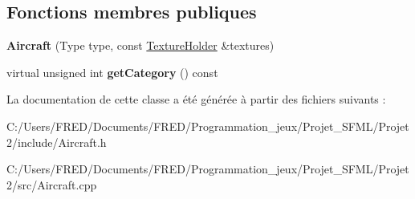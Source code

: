 \subsection*{Fonctions membres publiques}
\begin{DoxyCompactItemize}
\item 
{\bfseries Aircraft} (Type type, const \hyperlink{class_resource_holder}{Texture\+Holder} \&textures)\hypertarget{class_aircraft_ae42f913aa28db8c4657e515a583af1d2}{}\label{class_aircraft_ae42f913aa28db8c4657e515a583af1d2}

\item 
virtual unsigned int {\bfseries get\+Category} () const \hypertarget{class_aircraft_aa6e117ff8572e1cb41842ecda2e9f23d}{}\label{class_aircraft_aa6e117ff8572e1cb41842ecda2e9f23d}

\end{DoxyCompactItemize}


La documentation de cette classe a été générée à partir des fichiers suivants \+:\begin{DoxyCompactItemize}
\item 
C\+:/\+Users/\+F\+R\+E\+D/\+Documents/\+F\+R\+E\+D/\+Programmation\+\_\+jeux/\+Projet\+\_\+\+S\+F\+M\+L/\+Projet2/include/Aircraft.\+h\item 
C\+:/\+Users/\+F\+R\+E\+D/\+Documents/\+F\+R\+E\+D/\+Programmation\+\_\+jeux/\+Projet\+\_\+\+S\+F\+M\+L/\+Projet2/src/Aircraft.\+cpp\end{DoxyCompactItemize}
